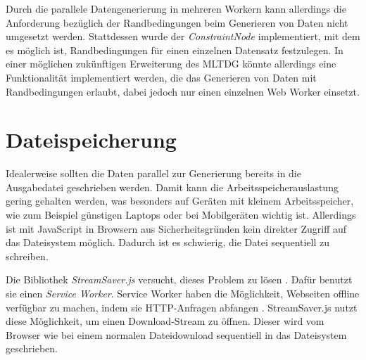 Durch die parallele Datengenerierung in mehreren Workern kann allerdings die Anforderung bezüglich der Randbedingungen beim Generieren von Daten nicht umgesetzt werden. Stattdessen wurde der \textit{ConstraintNode} implementiert, mit dem es möglich ist, Randbedingungen für einen einzelnen Datensatz festzulegen. In einer möglichen zukünftigen Erweiterung des \ac{MLTDG} könnte allerdings eine Funktionalität implementiert werden, die das Generieren von Daten mit Randbedingungen erlaubt, dabei jedoch nur einen einzelnen Web Worker einsetzt.

\section{Dateispeicherung}

Idealerweise sollten die Daten parallel zur Generierung bereits in die Ausgabedatei geschrieben werden. Damit kann die Arbeitsspeicherauslastung gering gehalten werden, was besonders auf Geräten mit kleinem Arbeitsspeicher, wie zum Beispiel günstigen Laptops oder bei Mobilgeräten wichtig ist. Allerdings ist mit JavaScript in Browsern aus Sicherheitsgründen kein direkter Zugriff auf das Dateisystem möglich. Dadurch ist es schwierig, die Datei sequentiell zu schreiben.

Die Bibliothek \textit{StreamSaver.js} versucht, dieses Problem zu lösen \cite{streamsaver}. Dafür benutzt sie einen \textit{Service Worker}. Service Worker haben die Möglichkeit, Webseiten offline verfügbar zu machen, indem sie HTTP-Anfragen abfangen \cite{mdn:serviceworker}. StreamSaver.js nutzt diese Möglichkeit, um einen Download-Stream zu öffnen. Dieser wird vom Browser wie bei einem normalen Dateidownload sequentiell in das Dateisystem geschrieben.


